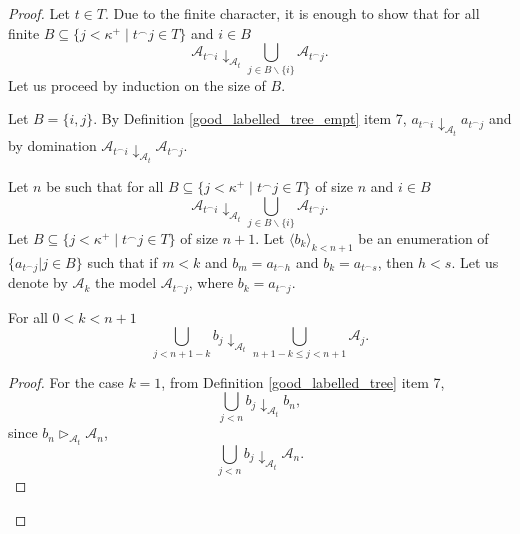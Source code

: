 \documentclass[10pt,a4paper]{amsart}
\renewcommand{\mid}{\mathrel{|}\allowbreak}
\begin{document}
\begin{proof}
    Let $t\in T$. Due to the finite character, it is enough to show that for all finite $B\subseteq \{j<\kappa^+\mid t^\frown j\in T\}$ and $i\in B$ $$\mathcal{A}_{t^\frown i}\downarrow_{\mathcal{A}_t} \bigcup_{j\in B\backslash \{i\}}\mathcal{A}_{t^\frown j}.$$ Let us proceed by induction on the size of $B$.

    Let $B=\{i,j\}$. By Definition \ref{good_labelled_tree_empt} item 7, $a_{t^\frown i}\downarrow_{\mathcal{A}_t} a_{t^\frown j}$ and by domination $\mathcal{A}_{t^\frown i}\downarrow_{\mathcal{A}_t} \mathcal{A}_{t^\frown j}$.

    Let $n$ be such that for all $B\subseteq \{j<\kappa^+\mid t^\frown j\in T\}$ of size $n$ and $i\in B$ $$\mathcal{A}_{t^\frown i}\downarrow_{\mathcal{A}_t} \bigcup_{j\in B\backslash \{i\}}\mathcal{A}_{t^\frown j}.$$ Let $B\subseteq \{j<\kappa^+\mid t^\frown j\in T\}$ of size $n+1$. Let $\langle b_k\rangle_{k<n+1}$ be an enumeration of $\{a_{t^\frown j}|j\in B\}$ such that if $m<k$ and $b_m=a_{t^\frown h}$ and $b_k=a_{t^\frown s}$, then $h<s$. Let us denote by $\mathcal{A}_k$ the model $\mathcal{A}_{t^\frown j}$, where $b_k=a_{t^\frown j}$.

    \begin{claim}
        For all $0<k<n+1$ $$\bigcup_{j<n+1-k}b_j\downarrow_{\mathcal{A}_t}\bigcup_{n+1-k\leq j<n+1}\mathcal{A}_j.$$
    \end{claim}
    \begin{proof}
        For the case $k=1$, from Definition \ref{good_labelled_tree} item 7, $$\bigcup_{j<n}b_j\downarrow_{\mathcal{A}_t}b_n,$$ since $b_n\triangleright_{\mathcal{A}_{t}}\mathcal{A}_n$, $$\bigcup_{j<n}b_j\downarrow_{\mathcal{A}_t}\mathcal{A}_n.$$


\end{proof}
\end{proof}
\end{document}

